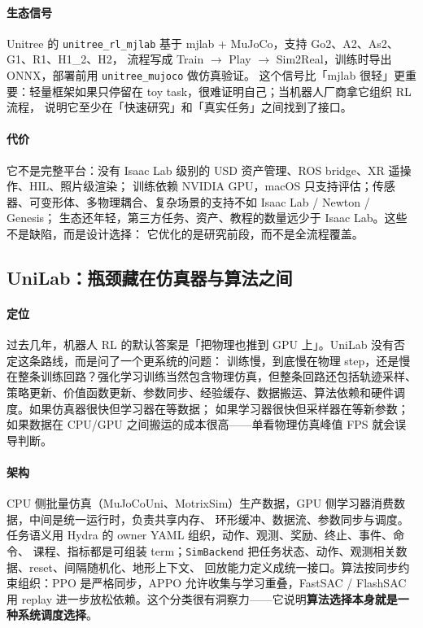 \documentclass[UTF8, 11pt, a4paper, fontset=windows]{ctexart}
\newcommand{\term}[1]{\texttt{#1}}
\begin{document}
\paragraph{生态信号}
Unitree 的 \term{unitree\_rl\_mjlab} 基于 mjlab + MuJoCo，支持 Go2、A2、As2、G1、R1、H1\_2、H2，
流程写成 Train $\rightarrow$ Play $\rightarrow$ Sim2Real，训练时导出 ONNX，部署前用 \term{unitree\_mujoco} 做仿真验证。
这个信号比「mjlab 很轻」更重要：轻量框架如果只停留在 toy task，很难证明自己；当机器人厂商拿它组织 RL 流程，
说明它至少在「快速研究」和「真实任务」之间找到了接口。

\paragraph{代价}
它不是完整平台：没有 Isaac Lab 级别的 USD 资产管理、ROS bridge、XR 遥操作、HIL、照片级渲染；
训练依赖 NVIDIA GPU，macOS 只支持评估；传感器、可变形体、多物理耦合、复杂场景的支持不如 Isaac Lab / Newton / Genesis；
生态还年轻，第三方任务、资产、教程的数量远少于 Isaac Lab。这些不是缺陷，而是设计选择：
它优化的是研究前段，而不是全流程覆盖。

\subsection{UniLab：瓶颈藏在仿真器与算法之间}

\paragraph{定位}
过去几年，机器人 RL 的默认答案是「把物理也推到 GPU 上」。UniLab 没有否定这条路线，而是问了一个更系统的问题：
训练慢，到底慢在物理 step，还是慢在整条训练回路？强化学习训练当然包含物理仿真，但整条回路还包括轨迹采样、
策略更新、价值函数更新、参数同步、经验缓存、数据搬运、算法依赖和硬件调度。如果仿真器很快但学习器在等数据；
如果学习器很快但采样器在等新参数；如果数据在 CPU/GPU 之间搬运的成本很高——单看物理仿真峰值 FPS 就会误导判断。

\paragraph{架构}
CPU 侧批量仿真（MuJoCoUni、MotrixSim）生产数据，GPU 侧学习器消费数据，中间是统一运行时，负责共享内存、
环形缓冲、数据流、参数同步与调度。任务语义用 Hydra 的 owner YAML 组织，动作、观测、奖励、终止、事件、命令、
课程、指标都是可组装 term；\term{SimBackend} 把任务状态、动作、观测相关数据、reset、间隔随机化、地形上下文、
回放能力定义成统一接口。算法按同步约束组织：PPO 是严格同步，APPO 允许收集与学习重叠，FastSAC / FlashSAC 用 replay
进一步放松依赖。这个分类很有洞察力——它说明\textbf{算法选择本身就是一种系统调度选择}。
\end{document}
